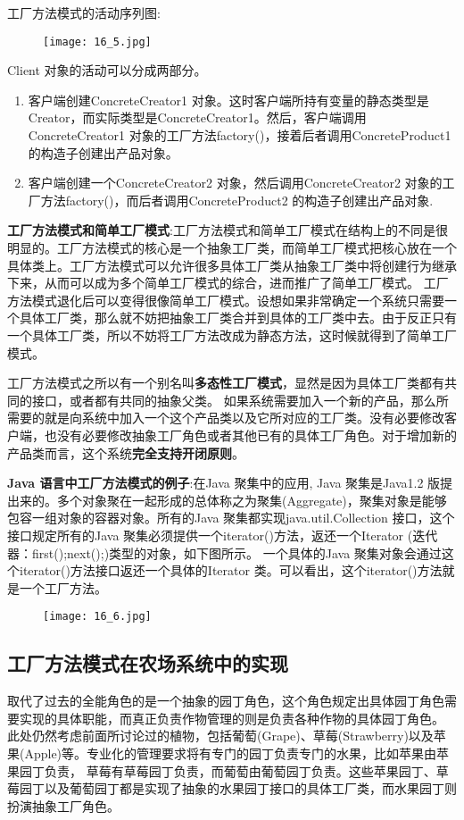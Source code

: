 \documentclass[../main.tex]{subfiles}
\begin{document}
工厂方法模式的活动序列图:
\begin{figure}[H]
  \texttt{[image: 16\_5.jpg]}
\end{figure}
Client 对象的活动可以分成两部分。
\begin{enumerate}
  \item 客户端创建ConcreteCreator1 对象。这时客户端所持有变量的静态类型是Creator，而实际类型是ConcreteCreator1。然后，客户端调用ConcreteCreator1 对象的工厂方法factory()，接着后者调用ConcreteProduct1 的构造子创建出产品对象。
  \item 客户端创建一个ConcreteCreator2 对象，然后调用ConcreteCreator2 对象的工厂方法factory()，而后者调用ConcreteProduct2 的构造子创建出产品对象.
\end{enumerate}
%
\textbf{工厂方法模式和简单工厂模式}:工厂方法模式和简单工厂模式在结构上的不同是很明显的。工厂方法模式的核心是一个抽象工厂类，而简单工厂模式把核心放在一个具体类上。工厂方法模式可以允许很多具体工厂类从抽象工厂类中将创建行为继承下来，从而可以成为多个简单工厂模式的综合，进而推广了简单工厂模式。
工厂方法模式退化后可以变得很像简单工厂模式。设想如果非常确定一个系统只需要一个具体工厂类，那么就不妨把抽象工厂类合并到具体的工厂类中去。由于反正只有一个具体工厂类，所以不妨将工厂方法改成为静态方法，这时候就得到了简单工厂模式。

工厂方法模式之所以有一个别名叫\textbf{多态性工厂模式}，显然是因为具体工厂类都有共同的接口，或者都有共同的抽象父类。
如果系统需要加入一个新的产品，那么所需要的就是向系统中加入一个这个产品类以及它所对应的工厂类。没有必要修改客户端，也没有必要修改抽象工厂角色或者其他已有的具体工厂角色。对于增加新的产品类而言，这个系统\textbf{完全支持开闭原则}。

\textbf{Java 语言中工厂方法模式的例子}:在Java 聚集中的应用,
Java 聚集是Java1.2 版提出来的。多个对象聚在一起形成的总体称之为聚集(Aggregate)，聚集对象是能够包容一组对象的容器对象。所有的Java 聚集都实现java.util.Collection 接口，这个接口规定所有的Java 聚集必须提供一个iterator()方法，返还一个Iterator (迭代器：first();next();)类型的对象，如下图所示。
一个具体的Java 聚集对象会通过这个iterator()方法接口返还一个具体的Iterator 类。可以看出，这个iterator()方法就是一个工厂方法。
\begin{figure}[H]
  \texttt{[image: 16\_6.jpg]}
\end{figure}
%
\subsection{工厂方法模式在农场系统中的实现}
\noindent 取代了过去的全能角色的是一个抽象的园丁角色，这个角色规定出具体园丁角色需要实现的具体职能，而真正负责作物管理的则是负责各种作物的具体园丁角色。
此处仍然考虑前面所讨论过的植物，包括葡萄(Grape)、草莓(Strawberry)以及苹果(Apple)等。专业化的管理要求将有专门的园丁负责专门的水果，比如苹果由苹果园丁负责，
草莓有草莓园丁负责，而葡萄由葡萄园丁负责。这些苹果园丁、草莓园丁以及葡萄园丁都是实现了抽象的水果园丁接口的具体工厂类，而水果园丁则扮演抽象工厂角色。
\end{document}

